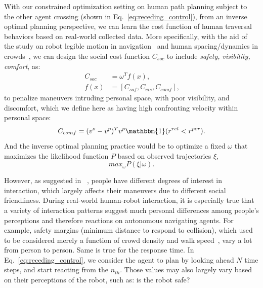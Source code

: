 \documentclass[conference]{IEEEtran}
\begin{document}
With our constrained optimization setting on human path planning subject to the other agent 
crossing (shown in Eq.~\ref{eq:receding_control}), from an inverse optimal 
planning perspective, we can learn the cost function of human traversal 
behaviors based on real-world collected data. More specifically, with the aid 
of the study on robot legible motion in 
navigation~\cite{kruse2012legible,lichtenthaler2012influence} and human 
spacing/dynamics in crowds~\cite{helbing1995social,hall1966hidden}, we can 
design the social cost function $C_{soc}$ to include \textit{safety, 
visibility, comfort}, as:
\begin{equation}~\label{eq:social_cost}
  \begin{aligned}
    C_{soc} &= \omega^T f(x), \\
    f(x) &= [C_{saf}, C_{vis}, C_{comf}],
  \end{aligned}
\end{equation}
to penalize maneuvers intruding personal space, with poor visibility, and 
discomfort, which we define here as having high confronting velocity within personal space:
\begin{equation}
  C_{comf} = (v^o-v^p)^T v^p \mathbbm{1}(r^{rel}<r^{per}).
\end{equation}
And the inverse optimal planning practice would be to optimize a fixed 
$\omega$ that maximizes the likelihood function $P$ based on observed 
trajectories $\xi$,
\begin{equation}
  max_{\omega} P(\xi|\omega).
\end{equation}

However, as suggested in ~\cite{hansen2009adaptive},
people have different degrees of interest in interaction, which largely 
affects their maneuvers due to different social friendliness. During 
real-world human-robot interaction, it is especially true that a variety of 
interaction patterns suggest much personal differences among 
people's perceptions and therefore reactions on autonomous navigating agents. For 
example, safety margins (minimum distance to respond to collision), which used 
to be considered merely a function of crowd density and walk speed~\cite{helbing1995social},
vary a lot from person to person. Same is true for the response time. In 
Eq.~\ref{eq:receding_control}, we consider the agent to plan by looking ahead 
$N$ time steps, and start reacting from the $n_{th}$. Those values may also largely 
vary based on their perceptions of the robot, such as: is the robot safe?  
\end{document}
